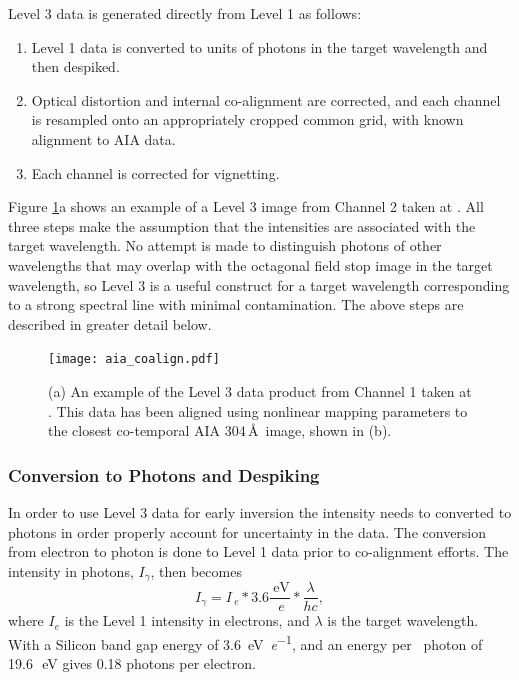 Level 3 data is generated directly from Level 1 as follows:
\begin{enumerate}
    \item Level 1 data is converted to units of photons in the target wavelength and then despiked.\label{step:photons}
    \item Optical distortion and internal co-alignment are corrected, and each channel is resampled onto an appropriately cropped common grid, with known alignment to AIA data.\label{step:distortion}
    \item Each channel is corrected for vignetting.\label{step:vignetting}
\end{enumerate}
Figure \ref{fig:coalign}a shows an example of a Level 3 image from Channel 2 taken at \levthreetime. All three steps make the assumption that the intensities are associated with the target wavelength. No attempt is made to distinguish photons of other wavelengths that may overlap with the octagonal field stop image in the target wavelength, so Level 3 is a useful construct for a target wavelength corresponding to a strong spectral line with minimal contamination. The above steps are described in greater detail below.


  \begin{figure}[htb!]
	\centering
	\texttt{[image: aia\_coalign.pdf]}
	\caption{(a) An example of the Level 3 data product from Channel 1 taken at \levthreetime. This data has been aligned using nonlinear mapping parameters to the closest co-temporal AIA 304\,\AA\ image, shown in (b). }
	\label{fig:coalign}
\end{figure}
    	
    
\subsubsection{Conversion to Photons and Despiking}
In order to use Level 3 data for early inversion the intensity needs to  converted to photons in order properly account for uncertainty in the data.
The conversion from electron to photon is done to Level 1 data prior to co-alignment efforts.
The intensity in photons, $I_{\gamma}$, then becomes
\begin{equation}
  I_{\gamma} = I_{\SI{}{\elementarycharge}} * 3.6 \frac{\SI{}{\electronvolt}}{\SI{}{\elementarycharge}} * \frac{\lambda}{hc},
\end{equation}
where $I_e$ is the Level 1 intensity in electrons, and $\lambda$ is the target wavelength.
With a Silicon band gap energy of \SI[per-mode=symbol]{3.6}{\electronvolt\per\elementarycharge}, and an energy per \ov \ photon 
of 19.6\,\SI{}{\electronvolt} gives 0.18 photons per electron.


